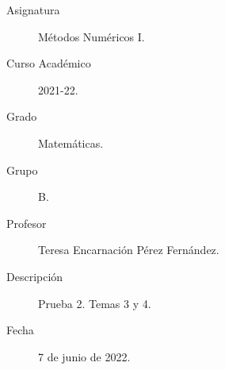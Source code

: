 \documentclass[12pt]{article}
\begin{document}

    
    

    \begin{description}
        \item[Asignatura] Métodos Numéricos I.
        \item[Curso Académico] 2021-22.
        \item[Grado] Matemáticas.
        \item[Grupo] B.
        \item[Profesor] Teresa Encarnación Pérez Fernández.
        \item[Descripción] Prueba 2. Temas 3 y 4.
        \item[Fecha] 7 de junio de 2022.
    
    \end{description}
    \newpage
    
\end{document}
